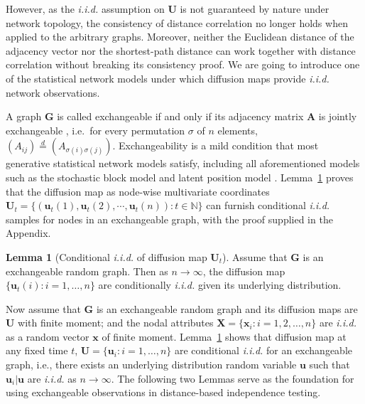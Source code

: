 \documentclass[11pt]{article}
\theoremstyle{definition}
\newtheorem{lemma}[theorem]{Lemma}
\begin{document}
However, as the \textit{i.i.d.} assumption on $\mathbf{U}$ is not guaranteed by nature under network topology, the consistency of distance correlation no longer holds when applied to the arbitrary graphs. Moreover, neither the Euclidean distance of the adjacency vector nor the shortest-path distance can work together with distance correlation without breaking its consistency proof. We are going to introduce one of the statistical network models under which diffusion maps provide \textit{i.i.d.} network observations. 

A graph $\mathbf{G}$ is called exchangeable if and only if its adjacency matrix $\mathbf{A}$ is jointly exchangeable \cite{orbanz2015bayesian}, i.e.~for every permutation $\sigma$ of $n$ elements, $(A_{ij}) \stackrel{d}{=} (A_{\sigma(i) \sigma(j)})$. Exchangeability is a mild condition that most generative statistical network models satisfy, including all aforementioned models such as the stochastic block model and latent position model \cite{rohe2011spectral, sussman2014consistent, todeschini2016exchangeable}. Lemma~\ref{main_lemma} proves that the diffusion map as node-wise multivariate coordinates $ \mathbf{U}_{t} =  \{ (\mathbf{u}_{t}(1), \mathbf{u}_{t}(2), \cdots, \mathbf{u}_{t}(n)   )    : t \in \mathbb{N} \}$ can furnish conditional \textit{i.i.d.} samples for nodes in an exchangeable graph, with the proof supplied in the Appendix.
\begin{lemma}[Conditional \textit{i.i.d.} of diffusion map $\mathbf{U}_{t}$]
	\label{main_lemma}
	Assume that $\mathbf{G}$ is an exchangeable random graph. Then as $n \rightarrow \infty$, the diffusion map $\{ \mathbf{u}_{t}(i) : i = 1, \ldots, n \}$ are conditionally \textit{i.i.d.} given its underlying distribution.  
\end{lemma}

Now assume that $\mathbf{G}$ is an exchangeable random graph and its diffusion maps are $\mathbf{U}$ with finite moment; and the nodal attributes $\mathbf{X}=\{ \mathbf{x}_{i}: i = 1,2, \ldots, n \}$ are \textit{i.i.d.} as a random vector $\mathbf{x}$ of finite moment. Lemma~\ref{main_lemma} shows that diffusion map at any fixed time $t$, $\mathbf{U} = \{ \mathbf{u}_{i} : i = 1, \ldots, n  \}$ are conditional \textit{i.i.d.} for an exchangeable graph, i.e., there exists an underlying distribution random variable $\mathbf{u}$ such that $\mathbf{u}_{i}|\mathbf{u}$ are \textit{i.i.d.} as $n \rightarrow \infty$. The following two Lemmas serve as the foundation for using exchangeable observations in distance-based independence testing. 
\end{document}
